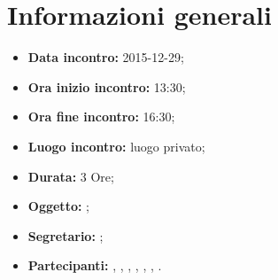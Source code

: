 \newpage
\section{Informazioni generali}
\begin{itemize}
\item \textbf{Data incontro:} 2015-12-29;
\item \textbf{Ora inizio incontro:} 13:30;
\item \textbf{Ora fine incontro:} 16:30;
\item \textbf{Luogo incontro:} luogo privato;
\item \textbf{Durata:} 3 Ore;
\item \textbf{Oggetto:} \AdR;
\item \textbf{Segretario:} \GN;
\item \textbf{Partecipanti:} \AF, \FB, \GN, \GR, \MV, \MP, \SM.

\end{itemize}
